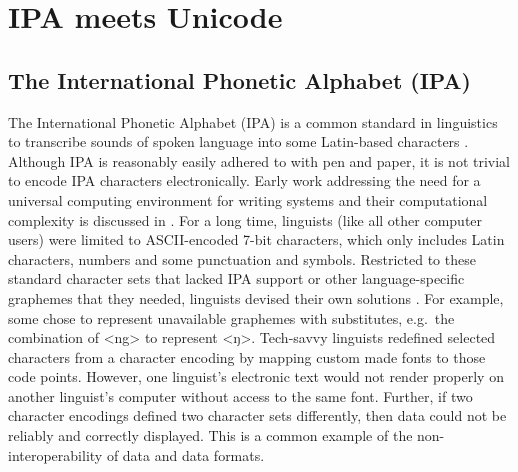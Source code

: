 \chapter{IPA meets Unicode}
\label{ipa-meets-unicode}

\section{The International Phonetic Alphabet (IPA)}
\label{the-international-phonetic-alphabet}

The International Phonetic Alphabet (IPA) is a common standard in linguistics to
transcribe sounds of spoken language into some Latin-based characters
\citep{IPA2005}. Although IPA is reasonably easily adhered to with pen and
paper, it is not trivial to encode IPA characters electronically. Early work
addressing the need for a universal computing environment for writing systems
and their computational complexity is discussed in \citet{Simons1989}. For a long
time, linguists (like all other computer users) were limited to ASCII-encoded
7-bit characters, which only includes Latin characters, numbers and some
punctuation and symbols. Restricted to these standard character sets that lacked
IPA support or other language-specific graphemes that they needed, linguists
devised their own solutions \citep{BirdSimons2003}. For example, some chose to
represent unavailable graphemes with substitutes, e.g.~the combination of <ng> to
represent <ŋ>. Tech-savvy linguists redefined selected characters from a character
encoding by mapping custom made fonts to those code points. However, one
linguist's electronic text would not render properly on another linguist's
computer without access to the same font. Further, if two character encodings
defined two character sets differently, then data could not be reliably and
correctly displayed. This is a common example of the non-interoperability of
data and data formats.

